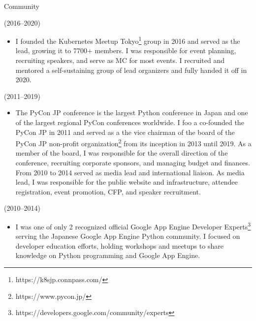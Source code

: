 \documentclass{resume}
\begin{document}
\begin{category}{Community}

     (2016--2020)

    \begin{itemize}[leftmargin=*]
        \item[] I founded the Kubernetes Meetup
            Tokyo\footnote{https://k8sjp.connpass.com/} group in 2016 and served
            as the lead, growing it to 7700+ members. I was responsible for
            event planning, recruiting speakers, and serve as MC for most
            events. I recruited and mentored a self-sustaining group of lead
            organizers and fully handed it off in 2020.
    \end{itemize}

     (2011--2019)

    \begin{itemize}[leftmargin=*]
        \item[] The PyCon JP conference is the largest Python conference in
            Japan and one of the largest regional PyCon conferences worldwide. I
            foo a co-founded the PyCon JP in 2011 and served as a the vice
            chairman of the board of the PyCon JP non-profit
            organization\footnote{https://www.pycon.jp/} from its inception in
            2013 until 2019. As a member of the board, I was responsible for the
                 overall direction of the conference, recruiting corporate
                 sponsors, and managing budget and finances. From 2010 to 2014
                 served as media lead and international liaison. As media lead,
                 I was responsible for the public website and infrastructure,
                 attendee registration, event promotion, CFP, and speaker
                 recruitment.
    \end{itemize}

     (2010--2014)

    \begin{itemize}[leftmargin=*]
        \item[] I was one of only 2 recognized official Google App Engine
            Developer
            Experts\footnote{https://developers.google.com/community/experts}
            serving the Japanese Google App Engine Python community. I focused
            on developer education efforts, holding workshops and meetups to
            share knowledge on Python programming and Google App Engine.
    \end{itemize}

\end{category}
\end{document}

